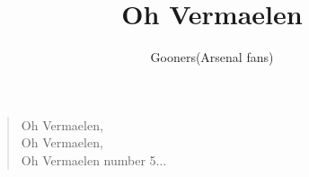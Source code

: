 \documentclass[a4paper,12pt]{article}
\title{Oh Vermaelen}
\author{Gooners(Arsenal fans)}
\date{}
\begin{document}
	
	\maketitle
	
	\begin{verse}
		
		Oh Vermaelen, \\
		Oh Vermaelen, \\
		Oh Vermaelen number 5$\ldots$
		
	\end{verse}
	
\end{document}
